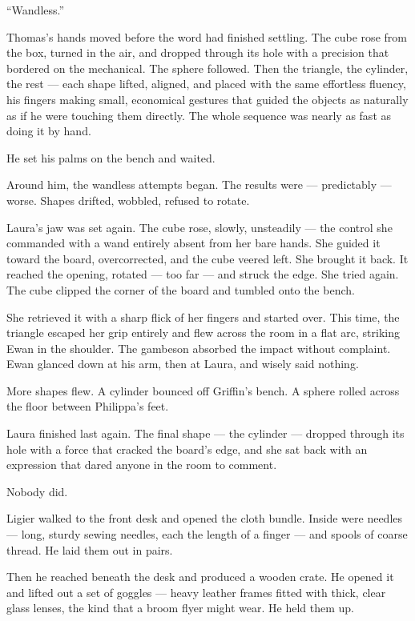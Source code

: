 \enquote{Wandless.}
 
Thomas's hands moved before the word had finished settling. The cube rose from the box, turned in the air, and dropped through its hole with a precision that bordered on the mechanical. The sphere followed. Then the triangle, the cylinder, the rest --- each shape lifted, aligned, and placed with the same effortless fluency, his fingers making small, economical gestures that guided the objects as naturally as if he were touching them directly. The whole sequence was nearly as fast as doing it by hand.
 
He set his palms on the bench and waited.
 
Around him, the wandless attempts began. The results were --- predictably --- worse. Shapes drifted, wobbled, refused to rotate.
 
Laura's jaw was set again. The cube rose, slowly, unsteadily --- the control she commanded with a wand entirely absent from her bare hands. She guided it toward the board, overcorrected, and the cube veered left. She brought it back. It reached the opening, rotated --- too far --- and struck the edge. She tried again. The cube clipped the corner of the board and tumbled onto the bench.
 
She retrieved it with a sharp flick of her fingers and started over. This time, the triangle escaped her grip entirely and flew across the room in a flat arc, striking Ewan in the shoulder. The gambeson absorbed the impact without complaint. Ewan glanced down at his arm, then at Laura, and wisely said nothing.
 
More shapes flew. A cylinder bounced off Griffin's bench. A sphere rolled across the floor between Philippa's feet.
 
Laura finished last again. The final shape --- the cylinder --- dropped through its hole with a force that cracked the board's edge, and she sat back with an expression that dared anyone in the room to comment.
 
Nobody did.
 
Ligier walked to the front desk and opened the cloth bundle. Inside were needles --- long, sturdy sewing needles, each the length of a finger --- and spools of coarse thread. He laid them out in pairs.
 
Then he reached beneath the desk and produced a wooden crate. He opened it and lifted out a set of goggles --- heavy leather frames fitted with thick, clear glass lenses, the kind that a broom flyer might wear. He held them up.
 
